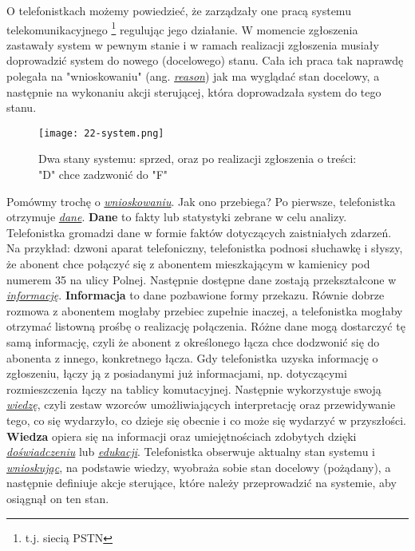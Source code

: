 O telefonistkach możemy powiedzieć, że zarządzały one pracą systemu telekomunikacyjnego \footnote{t.j. siecią PSTN} regulując jego działanie. W momencie zgłoszenia zastawały system w pewnym stanie i w ramach realizacji zgłoszenia musiały doprowadzić system do nowego (docelowego) stanu. Cała ich praca tak naprawdę polegała na "wnioskowaniu" (ang. \hyperlink{def:wnioskowanie}{\textit{reason}}) jak ma wyglądać stan docelowy, a następnie na wykonaniu akcji sterującej, która doprowadzała system do tego stanu. 

\begin{figure}[!htbp]
    \centering \texttt{[image: 22-system.png]}
    \caption{Dwa stany systemu: sprzed, oraz po realizacji zgłoszenia o treści: "D" chce zadzwonić do "F"}
\end{figure}

Pomówmy trochę o \hyperlink{def:wnioskowanie}{\textit{wnioskowaniu}}. Jak ono przebiega? Po pierwsze, telefonistka otrzymuje \hyperlink{def:dane}{\textit{dane}}. \textbf{Dane} to fakty lub statystyki zebrane w celu analizy. Telefonistka gromadzi dane w formie faktów dotyczących zaistniałych zdarzeń. Na przykład: dzwoni aparat telefoniczny, telefonistka podnosi słuchawkę i słyszy, że abonent chce połączyć się z abonentem mieszkającym w kamienicy pod numerem 35 na ulicy Polnej. Następnie dostępne dane zostają przekształcone w \hyperlink{def:informacja}{\textit{informację}}. \textbf{Informacja} to dane pozbawione formy przekazu. Równie dobrze rozmowa z abonentem mogłaby przebiec zupełnie inaczej, a telefonistka mogłaby otrzymać listowną prośbę o realizację połączenia. Różne dane mogą dostarczyć tę samą informację, czyli że abonent z określonego łącza chce dodzwonić się do abonenta z innego, konkretnego łącza. Gdy telefonistka uzyska informację o zgłoszeniu, łączy ją z posiadanymi już informacjami, np. dotyczącymi rozmieszczenia łączy na tablicy komutacyjnej. Następnie wykorzystuje swoją \hyperlink{def:wiedza}{\textit{wiedzę}}, czyli zestaw wzorców umożliwiających interpretację oraz przewidywanie tego, co się wydarzyło, co dzieje się obecnie i co może się wydarzyć w przyszłości. \textbf{Wiedza} opiera się na informacji oraz umiejętnościach zdobytych dzięki \hyperlink{def:doswiadczenie}{\textit{doświadczeniu}} lub \hyperlink{def:edukacja}{\textit{edukacji}}. Telefonistka obserwuje aktualny stan systemu i \hyperlink{def:wnioskowanie}{\textit{wnioskując}}, na podstawie wiedzy, wyobraża sobie stan docelowy (pożądany), a następnie definiuje akcje sterujące, które należy przeprowadzić na systemie, aby osiągnął on ten stan.


